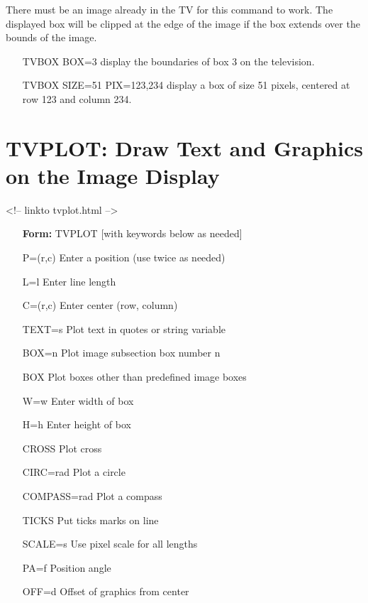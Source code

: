 There must be an image already in the TV for this command to work. The
displayed box will be clipped at the edge of the image if the box extends
over the bounds of the image.

\begin{itemize}
  \item[TVBOX BOX=3\hfill]{display the boundaries of box 3
       on the television.}
  \item[TVBOX SIZE=51 PIX=123,234\hfill]{display a box of size 51
       pixels, centered at row 123 and column 234.}
\end{itemize}

\section{TVPLOT: Draw Text and Graphics on the Image Display}
\begin{rawhtml}
<!-- linkto tvplot.html -->
\end{rawhtml}
\begin{itemize}
  \item[\textbf{Form: }TVPLOT {[with keywords below as needed]}\hfill]{}
  \item[P=(r,c)]{         Enter a position (use twice as needed)}
  \item[L=l]{             Enter line length}
  \item[C=(r,c)]{         Enter center (row, column)}
  \item[TEXT=s]{          Plot text in quotes or string variable}
  \item[BOX=n]{           Plot image subsection box number n}
  \item[BOX]{             Plot boxes other than predefined image boxes}
  \item[W=w]{             Enter width of box}
  \item[H=h]{             Enter height of box}
  \item[CROSS]{           Plot cross}
  \item[CIRC=rad]{        Plot a circle}
  \item[COMPASS=rad]{     Plot a compass}
  \item[TICKS]{           Put ticks marks on line}
  \item[SCALE=s]{         Use pixel scale for all lengths}
  \item[PA=f]{            Position angle}
  \item[OFF=d]{           Offset of graphics from center}
\end{itemize}

